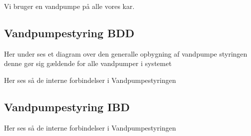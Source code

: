 
Vi bruger en vandpumpe på alle vores kar.

\subsection{Vandpumpestyring BDD}

Her under ses et diagram over den generalle opbygning af vandpumpe styringen denne gør sig gældende for alle vandpumper i systemet


Her ses så de interne forbindelser i Vandpumpestyringen 

\subsection{Vandpumpestyring IBD}

Her ses så de interne forbindelser i Vandpumpestyringen 

